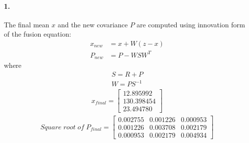 \documentclass[a4paper]{article}
\begin{document}
\paragraph{1. } The final mean $x$ and the new covariance $P$ are computed using innovation form of the fusion equation:
\begin{align*}
x_{new} &= x + W(z-x) \\
P_{new} &= P - WSW^{T}
\end{align*}
where
\begin{align*}
S = R + P \\
W = PS^{-1}
\end{align*}
\begin{align*}
x_{final} = 
	\begin{bmatrix}
		12.895992   \\  130.398454   \\   23.494780
	\end{bmatrix}
\end{align*}
\begin{align*}
Square \; root \; of \; P_{final} = 
	\begin{bmatrix}
        0.002755   &    0.001226   &    0.000953 \\
      	0.001226   &    0.003708   &    0.002179 \\
      	0.000953   &    0.002179   &    0.004934
	\end{bmatrix}
\end{align*}
\end{document}
